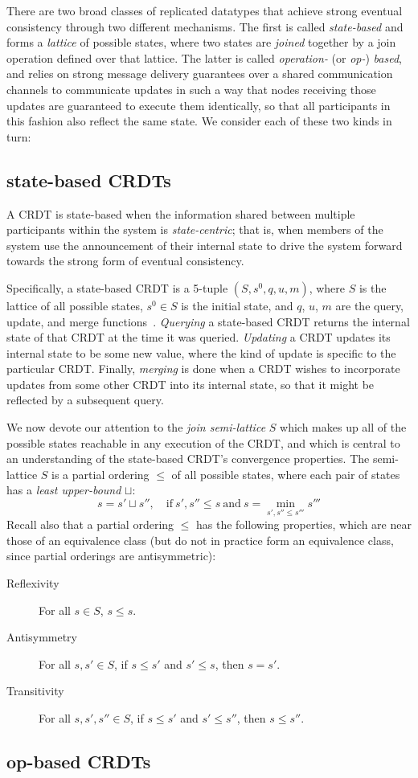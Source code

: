 There are two broad classes of replicated datatypes that achieve strong eventual
consistency through two different mechanisms. The first is called
\textit{state-based} and forms a \textit{lattice} of possible states, where two
states are \textit{joined} together by a join operation defined over that
lattice. The latter is called \textit{operation-} (or \textit{op-})
\textit{based}, and relies on strong message delivery guarantees over a shared
communication channels to communicate updates in such a way that nodes receiving
those updates are guaranteed to execute them identically, so that all
participants in this fashion also reflect the same state. We consider each of
these two kinds in turn:

\subsection{state-based CRDTs}
A CRDT is state-based when the information shared between multiple participants
within the system is \textit{state-centric}; that is, when members of the system
use the announcement of their internal state to drive the system forward towards
the strong form of eventual consistency.

Specifically, a state-based CRDT is a 5-tuple $(S, s^0, q, u, m)$, where $S$ is
the lattice of all possible states, $s^0 \in S$ is the initial state, and $q$,
$u$, $m$ are the query, update, and merge functions~\citep{shapiro11}.
\textit{Querying} a state-based CRDT returns the internal state of that CRDT at
the time it was queried. \textit{Updating} a CRDT updates its internal state to
be some new value, where the kind of update is specific to the particular CRDT.
Finally, \textit{merging} is done when a CRDT wishes to incorporate updates from
some other CRDT into its internal state, so that it might be reflected by a
subsequent query.

We now devote our attention to the \textit{join semi-lattice} $S$ which makes up
all of the possible states reachable in any execution of the CRDT, and which is
central to an understanding of the state-based CRDT's convergence properties.
The semi-lattice $S$ is a partial ordering $\leq$ of all possible states, where
each pair of states has a \textit{least upper-bound} $\sqcup$:
\[
  s = s' \sqcup s'',\quad \mathrm{if}~
    s', s'' \leq s~\mathrm{and}~
    s = \min_{s', s'' \leq s'''} s'''
\]
Recall also that a partial ordering $\leq$ has the following properties, which
are near those of an equivalence class (but do not in practice form an
equivalence class, since partial orderings are antisymmetric):
\begin{description}
  \item[Reflexivity] For all $s \in S$, $s \leq s$.
  \item[Antisymmetry] For all $s, s' \in S$, if $s \leq s'$ and $s' \leq s$,
    then $s = s'$.
  \item[Transitivity] For all $s, s', s'' \in S$, if $s \leq s'$ and $s' \leq
    s''$, then $s \leq s''$.
\end{description}


\subsection{op-based CRDTs}
